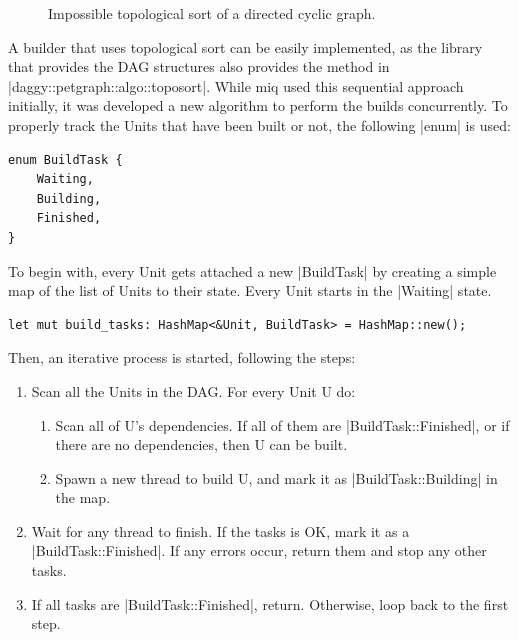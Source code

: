 \begin{figure}[hbtp]
    \centerfloat
    
    \caption{Impossible topological sort of a directed cyclic graph.}
    \label{fig:toposort3}
\end{figure}

\FloatBarrier

A builder that uses topological sort can be easily
implemented, as the library that provides the \ac{DAG}
structures also provides the method in
|daggy::petgraph::algo::toposort|. While miq used this
sequential approach initially, it was developed a new
algorithm to perform the builds concurrently. To properly
track the Units that have been built or not, the following
|enum| is used:

\begin{verbatim}
enum BuildTask {
    Waiting,
    Building,
    Finished,
}
\end{verbatim}

To begin with, every Unit gets attached a new |BuildTask| by
creating a simple map of the list of Units to their state.
Every Unit starts in the |Waiting| state.

\begin{verbatim}
let mut build_tasks: HashMap<&Unit, BuildTask> = HashMap::new();
\end{verbatim}

Then, an iterative process is started, following the steps:

\begin{enumerate}
    \item Scan all the Units in the \ac{DAG}. For every Unit U do:
    \begin{enumerate}
        \item Scan all of U's dependencies. If all of them
        are |BuildTask::Finished|, or if there are no dependencies,
        then U can be built.
        \item Spawn a new thread to build U, and mark it as
        |BuildTask::Building| in the map.
    \end{enumerate}
    \item Wait for any thread to finish. If the tasks is OK,
    mark it as a |BuildTask::Finished|. If any errors occur,
    return them and stop any other tasks.
    \item If all tasks are |BuildTask::Finished|, return.
    Otherwise, loop back to the first step.
\end{enumerate}

